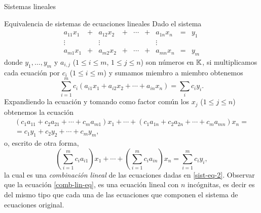 \begin{chapter}{Sistemas lineales}
\begin{section}{Equivalencia de sistemas de ecuaciones lineales}
            Dado el sistema
            \begin{equation}\label{sist-eq-2}
            \begin{matrix}
            a_{11}x_1& + &a_{12}x_2& + &\cdots& + &a_{1n}x_n &= &y_1\\
            \vdots&  &\vdots& &&  &\vdots \\
            a_{m1}x_1& + &a_{m2}x_2& + &\cdots& + &a_{mn}x_n &=&y_m
            \end{matrix}
            \end{equation}
            donde $y_1, \ldots,y_m$ y $a_{i,j}$ ($1 \le i \le m$, $1 \le j \le n$) son números en $\mathbb K$, si multiplicamos cada ecuación por $c_i$ ($1 \le i \le m$) y sumamos miembro a miembro obtenemos
            \begin{equation*}
            \sum_{i=1}^m c_i(a_{i1}x_1 + a_{i2}x_2 + \cdots + a_{in}x_n) = \sum_i c_iy_i.
            \end{equation*}
            Expandiendo la ecuación y tomando como factor común los $x_j$ ($1 \le j \le n$) obtenemos la ecuación
            \begin{multline*}
            (c_{1}a_{11} + c_2a_{21}+ \cdots + c_ma_{m1})x_1 + \cdots +  	(c_{1}a_{1n} + c_2a_{2n}+ \cdots + c_ma_{mn})x_n = \\ = 	c_{1}y_{1} + c_2y_{2}+ \cdots + c_my_{m},
            \end{multline*}
            o,  escrito de otra forma, 
            \begin{equation}\label{comb-lin-eq}
            \left(\sum_{i=1}^{m}c_{i}a_{i1}\right)x_1 + \cdots +  	\left(\sum_{i=1}^{m}c_{i}a_{in}\right)x_n = \sum_{i=1}^{m}	c_{i}y_{i},
            \end{equation}
            la cual es una \textit{combinación lineal} de las ecuaciones dadas en \eqref{sist-eq-2}. 
            Observar que la ecuación \eqref{comb-lin-eq},  es  una ecuación lineal con $n$ incógnitas, es decir  es del mismo tipo que cada una de las ecuaciones que componen el sistema de ecuaciones original.
            

\end{section}
\end{chapter}
